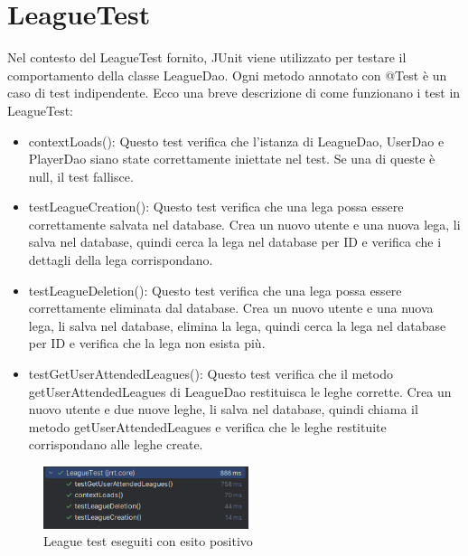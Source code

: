\documentclass[twoside,openright,titlepage,fleqn,headinclude,12pt,a4paper,BCOR=5mm,footinclude]{scrbook}
\begin{document}
\section{LeagueTest} 
Nel contesto del LeagueTest fornito, JUnit viene utilizzato per testare il comportamento della classe LeagueDao. Ogni metodo annotato con @Test è un caso di test indipendente. Ecco una breve descrizione di come funzionano i test in LeagueTest:  \begin{itemize} 
    \item contextLoads(): Questo test verifica che l'istanza di LeagueDao, UserDao e PlayerDao siano state correttamente iniettate nel test. Se una di queste è null, il test fallisce. 
    \item testLeagueCreation(): Questo test verifica che una lega possa essere correttamente salvata nel database. Crea un nuovo utente e una nuova lega, li salva nel database, quindi cerca la lega nel database per ID e verifica che i dettagli della lega corrispondano. 
    \item testLeagueDeletion(): Questo test verifica che una lega possa essere correttamente eliminata dal database. Crea un nuovo utente e una nuova lega, li salva nel database, elimina la lega, quindi cerca la lega nel database per ID e verifica che la lega non esista più. 
    \item testGetUserAttendedLeagues(): Questo test verifica che il metodo getUserAttendedLeagues di LeagueDao restituisca le leghe corrette. Crea un nuovo utente e due nuove leghe, li salva nel database, quindi chiama il metodo getUserAttendedLeagues e verifica che le leghe restituite corrispondano alle leghe create. \end{itemize}  
\begin{figure}[H] 
\centering \includegraphics[width=60mm]{images/leagueTest.png} \caption{League test eseguiti con esito positivo} \label{fig:leagueTests} 
\end{figure}
\end{document}
